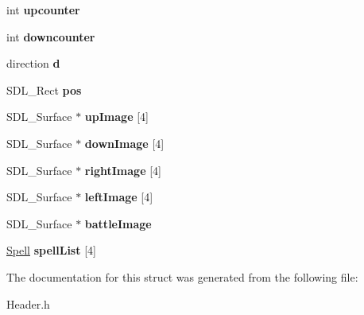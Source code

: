 \begin{DoxyCompactItemize}
\item 
int {\bfseries upcounter}\hypertarget{structEnemy_acb602ccb569b15f5eba388f46fa81495}{}\label{structEnemy_acb602ccb569b15f5eba388f46fa81495}

\item 
int {\bfseries downcounter}\hypertarget{structEnemy_af9c30e625005a209649cf8e3e392b5b6}{}\label{structEnemy_af9c30e625005a209649cf8e3e392b5b6}

\item 
direction {\bfseries d}\hypertarget{structEnemy_a2bd91391c42800869f146cee2590d529}{}\label{structEnemy_a2bd91391c42800869f146cee2590d529}

\item 
S\+D\+L\+\_\+\+Rect {\bfseries pos}\hypertarget{structEnemy_ab5abf403ad6178b1046732d9df2db0c1}{}\label{structEnemy_ab5abf403ad6178b1046732d9df2db0c1}

\item 
S\+D\+L\+\_\+\+Surface $\ast$ {\bfseries up\+Image} \mbox{[}4\mbox{]}\hypertarget{structEnemy_aab554cf0e1bc2eff76a4c4133fc8324e}{}\label{structEnemy_aab554cf0e1bc2eff76a4c4133fc8324e}

\item 
S\+D\+L\+\_\+\+Surface $\ast$ {\bfseries down\+Image} \mbox{[}4\mbox{]}\hypertarget{structEnemy_acaffe5b866d91cd19887eb365b948b2a}{}\label{structEnemy_acaffe5b866d91cd19887eb365b948b2a}

\item 
S\+D\+L\+\_\+\+Surface $\ast$ {\bfseries right\+Image} \mbox{[}4\mbox{]}\hypertarget{structEnemy_a79ff16d49480136bdaeebe8089c47e97}{}\label{structEnemy_a79ff16d49480136bdaeebe8089c47e97}

\item 
S\+D\+L\+\_\+\+Surface $\ast$ {\bfseries left\+Image} \mbox{[}4\mbox{]}\hypertarget{structEnemy_aba228b85b8e14c26edbfbfe0f7b1e301}{}\label{structEnemy_aba228b85b8e14c26edbfbfe0f7b1e301}

\item 
S\+D\+L\+\_\+\+Surface $\ast$ {\bfseries battle\+Image}\hypertarget{structEnemy_ad389759926772fb4442b5ce64f32b9dd}{}\label{structEnemy_ad389759926772fb4442b5ce64f32b9dd}

\item 
\hyperlink{structSpell}{Spell} {\bfseries spell\+List} \mbox{[}4\mbox{]}\hypertarget{structEnemy_a63ecb64ded9f4198bf2771158c8571b2}{}\label{structEnemy_a63ecb64ded9f4198bf2771158c8571b2}

\end{DoxyCompactItemize}


The documentation for this struct was generated from the following file\+:\begin{DoxyCompactItemize}
\item 
Header.\+h\end{DoxyCompactItemize}
